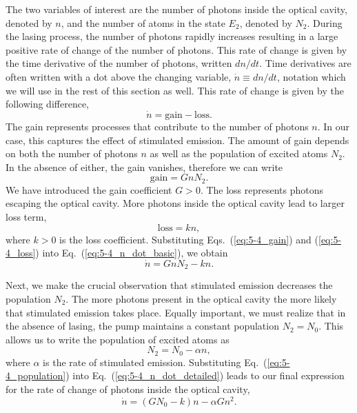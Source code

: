 The two variables of interest are the number of photons inside the optical cavity, denoted by $n$, and the number of atoms in the state $E_2$, denoted by $N_2$.
During the lasing process, the number of photons rapidly increases resulting in a large positive rate of change of the number of photons.
This rate of change is given by the time derivative of the number of photons, written $dn/dt$.
Time derivatives are often written with a dot above the changing variable, $\dot{n} \equiv dn/dt$, notation which we will use in the rest of this section as well.
This rate of change is given by the following difference,
\begin{equation}
    \dot{n} = \text{gain} - \text{loss}.
    \label{eq:5-4_n_dot_basic}
\end{equation}
The gain represents processes that contribute to the number of photons $n$.
In our case, this captures the effect of stimulated emission.
The amount of gain depends on both the number of photons $n$ as well as the population of excited atoms $N_2$.
In the absence of either, the gain vanishes, therefore we can write
\begin{equation}
    \text{gain} = G n  N_2.
    \label{eq:5-4_gain}
\end{equation}
We have introduced the gain coefficient $G>0$.
The loss represents photons escaping the optical cavity.
More photons inside the optical cavity lead to larger loss term,
\begin{equation}
    \text{loss} = k n,
    \label{eq:5-4_loss}
\end{equation}
where $k>0$ is the loss coefficient.
Substituting Eqs.~(\ref{eq:5-4_gain}) and (\ref{eq:5-4_loss}) into Eq.~(\ref{eq:5-4_n_dot_basic}), we obtain
\begin{equation}
    \dot{n} = G n N_2 - k n.
    \label{eq:5-4_n_dot_detailed}
\end{equation}

Next, we make the crucial observation that stimulated emission decreases the population $N_2$.
The more photons present in the optical cavity the more likely that stimulated emission takes place.
Equally important, we must realize that in the absence of lasing, the pump maintains a constant population $N_2 = N_0$.
This allows us to write the population of excited atoms as
\begin{equation}
    N_2 = N_0 - \alpha n,
    \label{eq:5-4_population}
\end{equation}
where $\alpha$ is the rate of stimulated emission.
Substituting Eq.~(\ref{eq:5-4_population}) into Eq.~(\ref{eq:5-4_n_dot_detailed}) leads to our final expression for the rate of change of photons inside the optical cavity,
\begin{equation}
    \dot{n} = (G N_0 - k) n - \alpha G n^2.
    \label{eq:5-4_n_dot_final}
\end{equation}

